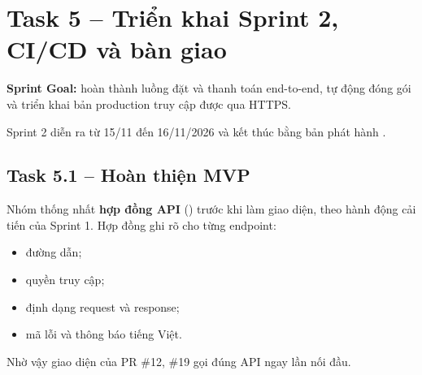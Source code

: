 \section{Task 5 -- Triển khai Sprint 2, CI/CD và bàn giao}\label{ch:sprint2}

\textbf{Sprint Goal:} hoàn thành luồng đặt và thanh toán end-to-end, tự động đóng gói và triển khai bản production truy cập được qua HTTPS.

Sprint 2 diễn ra từ 15/11 đến 16/11/2026 và kết thúc bằng bản phát hành .



\subsection{Task 5.1 -- Hoàn thiện MVP}
Nhóm thống nhất \textbf{hợp đồng API} () trước khi làm giao diện, theo hành động cải tiến của Sprint 1. Hợp đồng ghi rõ cho từng endpoint:
\begin{itemize}
\item đường dẫn;
\item quyền truy cập;
\item định dạng request và response;
\item mã lỗi và thông báo tiếng Việt.
\end{itemize}

Nhờ vậy giao diện của PR \#12, \#19 gọi đúng API ngay lần nối đầu.

